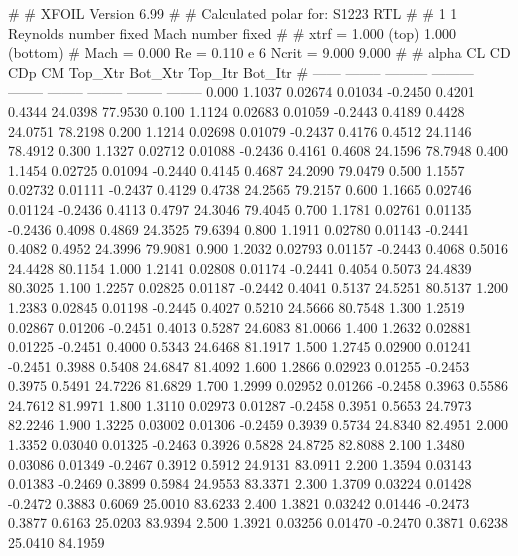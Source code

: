 #  
#       XFOIL         Version 6.99
#  
# Calculated polar for: S1223 RTL                                       
#  
# 1 1 Reynolds number fixed          Mach number fixed         
#  
# xtrf =   1.000 (top)        1.000 (bottom)  
# Mach =   0.000     Re =     0.110 e 6     Ncrit =   9.000  9.000
#  
#   alpha    CL        CD       CDp       CM     Top_Xtr  Bot_Xtr  Top_Itr  Bot_Itr
#  ------ -------- --------- --------- -------- -------- -------- -------- --------
   0.000   1.1037   0.02674   0.01034  -0.2450   0.4201   0.4344  24.0398  77.9530
   0.100   1.1124   0.02683   0.01059  -0.2443   0.4189   0.4428  24.0751  78.2198
   0.200   1.1214   0.02698   0.01079  -0.2437   0.4176   0.4512  24.1146  78.4912
   0.300   1.1327   0.02712   0.01088  -0.2436   0.4161   0.4608  24.1596  78.7948
   0.400   1.1454   0.02725   0.01094  -0.2440   0.4145   0.4687  24.2090  79.0479
   0.500   1.1557   0.02732   0.01111  -0.2437   0.4129   0.4738  24.2565  79.2157
   0.600   1.1665   0.02746   0.01124  -0.2436   0.4113   0.4797  24.3046  79.4045
   0.700   1.1781   0.02761   0.01135  -0.2436   0.4098   0.4869  24.3525  79.6394
   0.800   1.1911   0.02780   0.01143  -0.2441   0.4082   0.4952  24.3996  79.9081
   0.900   1.2032   0.02793   0.01157  -0.2443   0.4068   0.5016  24.4428  80.1154
   1.000   1.2141   0.02808   0.01174  -0.2441   0.4054   0.5073  24.4839  80.3025
   1.100   1.2257   0.02825   0.01187  -0.2442   0.4041   0.5137  24.5251  80.5137
   1.200   1.2383   0.02845   0.01198  -0.2445   0.4027   0.5210  24.5666  80.7548
   1.300   1.2519   0.02867   0.01206  -0.2451   0.4013   0.5287  24.6083  81.0066
   1.400   1.2632   0.02881   0.01225  -0.2451   0.4000   0.5343  24.6468  81.1917
   1.500   1.2745   0.02900   0.01241  -0.2451   0.3988   0.5408  24.6847  81.4092
   1.600   1.2866   0.02923   0.01255  -0.2453   0.3975   0.5491  24.7226  81.6829
   1.700   1.2999   0.02952   0.01266  -0.2458   0.3963   0.5586  24.7612  81.9971
   1.800   1.3110   0.02973   0.01287  -0.2458   0.3951   0.5653  24.7973  82.2246
   1.900   1.3225   0.03002   0.01306  -0.2459   0.3939   0.5734  24.8340  82.4951
   2.000   1.3352   0.03040   0.01325  -0.2463   0.3926   0.5828  24.8725  82.8088
   2.100   1.3480   0.03086   0.01349  -0.2467   0.3912   0.5912  24.9131  83.0911
   2.200   1.3594   0.03143   0.01383  -0.2469   0.3899   0.5984  24.9553  83.3371
   2.300   1.3709   0.03224   0.01428  -0.2472   0.3883   0.6069  25.0010  83.6233
   2.400   1.3821   0.03242   0.01446  -0.2473   0.3877   0.6163  25.0203  83.9394
   2.500   1.3921   0.03256   0.01470  -0.2470   0.3871   0.6238  25.0410  84.1959
